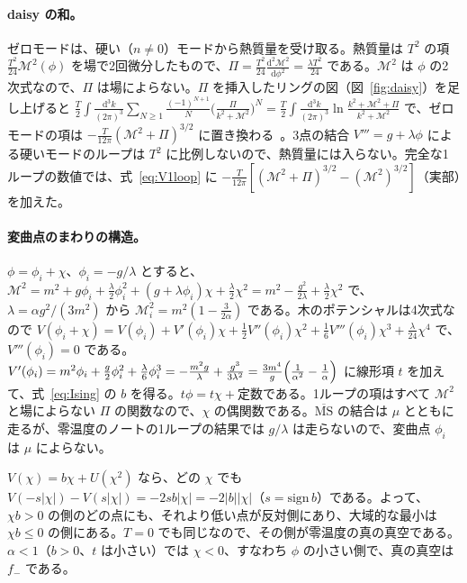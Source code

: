 \documentclass[a4paper,10pt]{ltjsarticle}
\newcommand{\dd}{\mathrm{d}}
\begin{document}
\paragraph{daisy の和。}ゼロモードは、硬い（$n\ne0$）モードから熱質量を受け取る。熱質量は $T^2$ の項 $\frac{T^2}{24}\mathcal M^2(\phi)$ を場で2回微分したもので、$\Pi=\frac{T^2}{24}\frac{\dd^2\mathcal M^2}{\dd\phi^2}=\frac{\lambda T^2}{24}$ である。$\mathcal M^2$ は $\phi$ の2次式なので、$\Pi$ は場によらない。$\Pi$ を挿入したリングの図（図~\ref{fig:daisy}）を足し上げると $\frac T2\int\frac{\dd^3k}{(2\pi)^3}\sum_{N\ge1}\frac{(-1)^{N+1}}N\bigl(\frac{\Pi}{k^2+\mathcal M^2}\bigr)^N=\frac T2\int\frac{\dd^3k}{(2\pi)^3}\ln\frac{k^2+\mathcal M^2+\Pi}{k^2+\mathcal M^2}$ で、ゼロモードの項は $-\frac{T}{12\pi}(\mathcal M^2+\Pi)^{3/2}$ に置き換わる~\cite{arnoldespinosa}。3点の結合 $V'''=g+\lambda\phi$ による硬いモードのループは $T^2$ に比例しないので、熱質量には入らない。完全な1ループの数値では、式~\eqref{eq:V1loop} に $-\frac T{12\pi}[(\mathcal M^2+\Pi)^{3/2}-(\mathcal M^2)^{3/2}]$（実部）を加えた。

\paragraph{変曲点のまわりの構造。}$\phi=\phi_i+\chi$、$\phi_i=-g/\lambda$ とすると、$\mathcal M^2=m^2+g\phi_i+\frac\lambda2\phi_i^2+(g+\lambda\phi_i)\chi+\frac\lambda2\chi^2=m^2-\frac{g^2}{2\lambda}+\frac\lambda2\chi^2$ で、$\lambda=\alpha g^2/(3m^2)$ から $\mathcal M_i^2=m^2(1-\frac3{2\alpha})$ である。木のポテンシャルは4次式なので $V(\phi_i+\chi)=V(\phi_i)+V'(\phi_i)\chi+\frac12V''(\phi_i)\chi^2+\frac16V'''(\phi_i)\chi^3+\frac\lambda{24}\chi^4$ で、$V'''(\phi_i)=0$ である。$V'(\phi_i)=m^2\phi_i+\frac g2\phi_i^2+\frac\lambda6\phi_i^3=-\frac{m^2g}\lambda+\frac{g^3}{3\lambda^2}=\frac{3m^4}{g}\Bigl(\frac1{\alpha^2}-\frac1\alpha\Bigr)$ に線形項 $t$ を加えて、式~\eqref{eq:Ising} の $b$ を得る。$t\phi=t\chi+$定数である。1ループの項はすべて $\mathcal M^2$ と場によらない $\Pi$ の関数なので、$\chi$ の偶関数である。$\overline{\mathrm{MS}}$ の結合は $\mu$ とともに走るが、零温度のノートの1ループの結果では $g/\lambda$ は走らないので、変曲点 $\phi_i$ は $\mu$ によらない。

$V(\chi)=b\chi+U(\chi^2)$ なら、どの $\chi$ でも $V(-s|\chi|)-V(s|\chi|)=-2s b|\chi|=-2|b||\chi|$（$s=\mathrm{sign}\,b$）である。よって、$\chi b>0$ の側のどの点にも、それより低い点が反対側にあり、大域的な最小は $\chi b\le0$ の側にある。$T=0$ でも同じなので、その側が零温度の真の真空である。$\alpha<1$（$b>0$、$t$ は小さい）では $\chi<0$、すなわち $\phi$ の小さい側で、真の真空は $f_-$ である。
\end{document}
